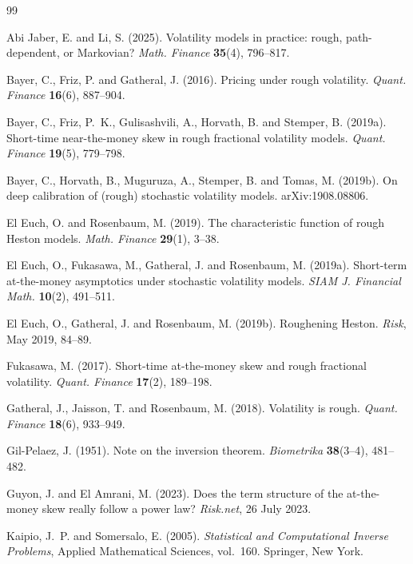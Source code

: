 \documentclass[11pt,a4paper]{article}
\numberwithin{equation}{section}
\begin{document}
\begin{thebibliography}{99}

 Abi Jaber, E. and Li, S. (2025).
Volatility models in practice: rough, path-dependent, or Markovian?
\emph{Math. Finance} \textbf{35}(4), 796--817.

 Bayer, C., Friz, P. and Gatheral, J. (2016).
Pricing under rough volatility.
\emph{Quant. Finance} \textbf{16}(6), 887--904.

 Bayer, C., Friz, P.~K., Gulisashvili, A., Horvath, B.
and Stemper, B. (2019a).
Short-time near-the-money skew in rough fractional volatility models.
\emph{Quant. Finance} \textbf{19}(5), 779--798.

 Bayer, C., Horvath, B., Muguruza, A., Stemper, B.
and Tomas, M. (2019b).
On deep calibration of (rough) stochastic volatility models. arXiv:1908.08806.

 El Euch, O. and Rosenbaum, M. (2019).
The characteristic function of rough Heston models.
\emph{Math. Finance} \textbf{29}(1), 3--38.

 El Euch, O., Fukasawa, M., Gatheral, J.
and Rosenbaum, M. (2019a).
Short-term at-the-money asymptotics under stochastic volatility models.
\emph{SIAM J. Financial Math.} \textbf{10}(2), 491--511.

 El Euch, O., Gatheral, J. and Rosenbaum, M. (2019b).
Roughening Heston. \emph{Risk}, May 2019, 84--89.

 Fukasawa, M. (2017).
Short-time at-the-money skew and rough fractional volatility.
\emph{Quant. Finance} \textbf{17}(2), 189--198.

 Gatheral, J., Jaisson, T. and Rosenbaum, M. (2018).
Volatility is rough. \emph{Quant. Finance} \textbf{18}(6), 933--949.

 Gil-Pelaez, J. (1951).
Note on the inversion theorem. \emph{Biometrika} \textbf{38}(3--4), 481--482.

 Guyon, J. and El Amrani, M. (2023).
Does the term structure of the at-the-money skew really follow a power law?
\emph{Risk.net}, 26 July 2023.

 Kaipio, J.~P. and
Somersalo, E. (2005). \emph{Statistical and Computational Inverse Problems},
Applied Mathematical Sciences, vol.~160. Springer, New York.


\end{thebibliography}
\end{document}
